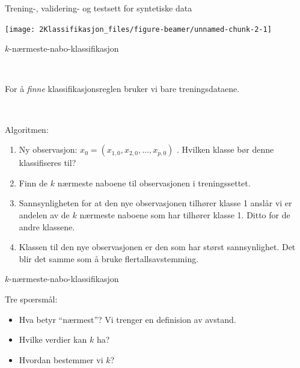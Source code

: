 \documentclass[10pt,ignorenonframetext,]{beamer}
\providecommand{\tightlist}{%
  \setlength{\itemsep}{0pt}\setlength{\parskip}{0pt}}
\begin{document}
\begin{frame}{Trening-, validering- og testsett for syntetiske data}
\protect\hypertarget{trening--validering--og-testsett-for-syntetiske-data}{}

\begin{center}\texttt{[image: 2Klassifikasjon\_files/figure-beamer/unnamed-chunk-2-1]} \end{center}

\end{frame}

\begin{frame}{\(k\)-nærmeste-nabo-klassifikasjon}
\protect\hypertarget{k-nuxe6rmeste-nabo-klassifikasjon}{}

\(~\)

For å \emph{finne} klassifikasjonsreglen bruker vi bare treningsdataene.

\(~\)

Algoritmen:

\begin{enumerate}
[1)]
\item
  Ny observasjon: \(x_0=(x_{1,0}, x_{2,0} , \ldots , x_{p,0})\) .
  Hvilken klasse bør denne klassifiseres til?
\item
  Finn de \(k\) nærmeste naboene til observasjonen i treningssettet.
\item
  Sannsynligheten for at den nye observasjonen tilhører klasse 1 anslår
  vi er andelen av de \(k\) nærmeste naboene som har tilhører klasse 1.
  Ditto for de andre klassene.
\item
  Klassen til den nye observasjonen er den som har størst sannsynlighet.
  Det blir det samme som å bruke flertallsavstemming.
\end{enumerate}

\end{frame}

\begin{frame}{\(k\)-nærmeste-nabo-klassifikasjon}
\protect\hypertarget{k-nuxe6rmeste-nabo-klassifikasjon-1}{}

\vspace{5mm}

Tre sp\oe rsm\aa l: \vspace{5mm}

\begin{itemize}
\tightlist
\item
  Hva betyr ``n\ae rmest''? Vi trenger en definision av avstand.
\end{itemize}

\vspace{1.5cm}

\begin{itemize}
\tightlist
\item
  Hvilke verdier kan \(k\) ha?
\end{itemize}

\vspace{1.5cm}

\begin{itemize}
\tightlist
\item
  Hvordan bestemmer vi \(k\)?
\end{itemize}

\end{frame}
\end{document}
